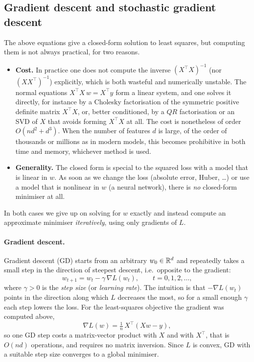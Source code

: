 

\subsection{Gradient descent and stochastic gradient descent}
\label{subsec:gd}

The above equations give a closed-form solution to least squares, but computing
them is not always practical, for two reasons.
\begin{itemize}
    \item \textbf{Cost.} In practice one does not compute the inverse
    $(X^\top X)^{-1}$ (nor $(X X^\top)^{-1}$)  explicitly, which is both wasteful and numerically unstable.
    The normal equations $X^\top X\, w = X^\top y$ form a linear system, and one
    solves it directly, for instance by a Cholesky factorisation of the symmetric
    positive definite matrix $X^\top X$, or, better conditioned, by a $QR$ factorisation or
    an SVD of $X$ that avoids forming $X^\top X$ at all. The cost is nonetheless of
    order $O(n d^2 + d^3)$. When the number of features $d$ is large, of the order
    of thousands or millions as in modern models, this becomes prohibitive in both
    time and memory, whichever method is used.
    \item \textbf{Generality.} The closed form is special to the squared loss with
    a model that is linear in $w$. As soon as we change the loss (absolute error,
    Huber, \dots) or use a model that is nonlinear in $w$ (a neural network), there
    is \emph{no} closed-form minimiser at all.
\end{itemize}
In both cases we give up on solving for $w$ exactly and instead compute an
approximate minimiser \emph{iteratively}, using only gradients of $L$.

\paragraph{Gradient descent.}
Gradient descent (GD) starts from an arbitrary $w_0 \in \mathbb{R}^d$ and repeatedly takes
a small step in the direction of steepest descent, i.e.\ opposite to the gradient:
\[
w_{t+1} = w_t - \gamma\, \nabla L(w_t), \qquad t = 0, 1, 2, \dots,
\]
where $\gamma > 0$ is the \emph{step size} (or \emph{learning rate}). The
intuition is that $-\nabla L(w_t)$ points in the direction along which $L$
decreases the most, so for a small enough $\gamma$ each step lowers the loss. For
the least-squares objective the gradient was computed above,
\[
\nabla L(w) = \tfrac{1}{n}\, X^\top (X w - y),
\]
so one GD step costs a matrix-vector product with $X$ and with $X^\top$, that is
$O(n d)$ operations, and requires no matrix inversion. Since $L$ is convex, GD with
a suitable step size converges to a global minimiser.

